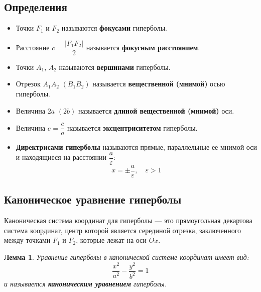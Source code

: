 \documentclass[a4paper,12pt,oneside]{extbook}
\theoremstyle{numbered}
\theoremstyle{unnumbered}
\theoremstyle{named}
\theoremstyle{unnumbered}
\theoremstyle{named}
\newtheorem{lemma}{Лемма}[section]
\theoremstyle{named}
\theoremstyle{named}
\begin{document}
\subsection{Определения}%
\label{sub:Определения}

\begin{itemize}
    \item {Точки \(F_1\) и \(F_2\) называются \textbf{фокусами} гиперболы.}
    \item {Расстояние \(c = \dfrac{|F_1 F_2|}{2}\) называется \textbf{фокусным расстоянием}.}
    \item {Точки \(A_1\), \(A_2\) называются \textbf{вершинами} гиперболы.}
    \item {Отрезок \(A_1 A_2\) \((B_1 B_2)\) называется \textbf{вещественной (мнимой)} осью гиперболы.}
    \item {Величина \(2a\) \((2b)\) называется \textbf{длиной вещественной (мнимой)} оси.}
    \item {Величина \(e = \dfrac{c}{a}\) называется \textbf{эксцентриситетом} гиперболы.}
    \item {
          \textbf{Директрисами гиперболы} называются прямые, параллельные ее мнимой оси и находящиеся на расстоянии \(\dfrac{a}{\varepsilon}\):
          \[
              x = \pm \dfrac{a}{\varepsilon}, \quad \varepsilon > 1
          \]
          }
\end{itemize}

\subsection{Каноническое уравнение гиперболы}%
\label{sub:Каноническое уравнение гиперболы}
\begin{siderules}
    Каноническая система координат для гиперболы — это прямоугольная декартова система координат, центр которой является серединой отрезка, заключенного между точками \(F_1\) и \(F_2\), которые лежат на оси \(Ox\).
\end{siderules}

\begin{lemma}
    Уравнение гиперболы в канонической системе координат имеет вид:
    \[
        \frac{x^2}{a^2} - \frac{y^2}{b^2} = 1
    \]
    и называется \textbf{каноническим уравнением} гиперболы.
\end{lemma}
\end{document}
